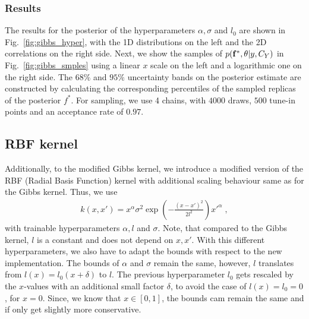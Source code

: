 \documentclass[11pt,a4paper]{article}
\begin{document}
\subsubsection{Results}
%
The results for the posterior of the hyperparameters $\alpha, \sigma$ and $l_0$ are shown in Fig.~\ref{fig:gibbs_hyper}, with the 1D distributions on the left and the 2D correlations on the right side.
Next, we show the samples of $p(\mathbf{f^*}, \theta |y, C_Y)$ in Fig.~\ref{fig:gibbs_smples} using a linear $x$ scale on the left and a logarithmic one on the right side. The $68\%$ and $95\%$ uncertainty bands on the posterior estimate are constructed by calculating the corresponding percentiles of the sampled replicas of the posterior $f^*$. For sampling, we use 4 chains, with $4000$ draws, $500$ tune-in points and an acceptance rate of $0.97$.
%
%
%
%

\subsection{RBF kernel}

Additionally, to the modified Gibbs kernel, we introduce a modified version of the RBF (Radial Basis Function) kernel with additional scaling behaviour same as for the Gibbs kernel. Thus, we use
%
\begin{align}
    k(x, x') = x^\alpha \sigma^2 \exp\left(- \frac{(x-x')^2}{2 l^2} \right) x'^\alpha \; ,
\end{align}
%
with trainable hyperparameters $\alpha, l$ and $\sigma$. Note, that compared to the Gibbs kernel, $l$ is a constant and does not depend on $x, x'$. With this different hyperparameters, we also have to adapt the bounds with respect to the new implementation. The bounds of $\alpha$ and $\sigma$ remain the same, however, $l$ translates from $l(x) = l_0 (x + \delta)$ to $l$. The previous hyperparameter $l_0$ gets rescaled by the $x$-values with an additional small factor $\delta$, to avoid the case of $l(x) = l_0 = 0$, for $x=0$. Since, we know that $x \in [0, 1]$, the bounds cam remain the same and if only get slightly more conservative.
\end{document}
